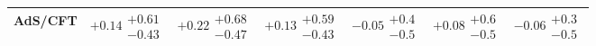 \begin{table}[H]
\begin{tabular}{lllllll}
AdS/CFT & $+0.14\substack{+0.61 \\ -0.43}$ & $+0.22\substack{+0.68 \\ -0.47}$ & $+0.13\substack{+0.59 \\ -0.43}$ & $-0.05\substack{+0.4 \\ -0.5}$ & $+0.08\substack{+0.6 \\ -0.5}$ & $-0.06\substack{+0.3 \\ -0.5}$ \\
\bottomrule
\end{tabular}\normalsize\renewcommand{\arraystretch}{1}
\end{table}
